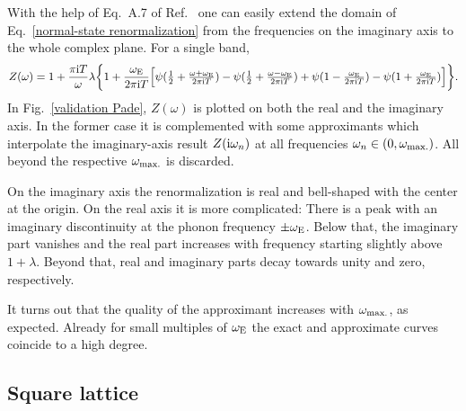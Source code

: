 With the help of Eq.~A.7 of Ref.~ one can easily
extend the domain of Eq.~\ref{normal-state renormalization} from the
 frequencies on the imaginary axis to the whole complex plane.
For a single band,
%
\begin{equation*}
    Z(\omega) = 1 + \frac {\pi \mathrm i T} \omega \lambda \bigg \{
        1 + \frac{\omega \sb{\text{E}}}{2 \pi \mathrm i T} \Big[
              \psi(\tfrac 1 2 + \tfrac{\omega + \omega \sb{\text{E}}}{2 \pi \mathrm i T})
            - \psi(\tfrac 1 2 + \tfrac{\omega - \omega \sb{\text{E}}}{2 \pi \mathrm i T})
            + \psi(1 - \tfrac{\omega \sb{\text{E}}}{2 \pi \mathrm i T})
            - \psi(1 + \tfrac{\omega \sb{\text{E}}}{2 \pi \mathrm i T})
        \Big]
    \bigg \}.
\end{equation*}
%
In Fig.~\ref{validation Pade}, $Z(\omega)$ is plotted on both the real and the
imaginary axis. In the former case it is complemented with some 
approximants which interpolate the imaginary-axis result $Z(\mathrm i \omega_n)$ at all
 frequencies $\omega_n \in (0, \omega \sb{\text{max.}})$. All beyond
the respective $\omega \sb{\text{max.}}$ is discarded.

On the imaginary axis the renormalization is real and bell-shaped with the
center at the origin. On the real axis it is more complicated: There is a peak
with an imaginary discontinuity at the phonon frequency $\pm \omega \sb{\text{E}}$.
Below that, the imaginary part vanishes and the real part increases with
frequency starting slightly above $1 + \lambda$. Beyond that, real and imaginary
parts decay towards unity and zero, respectively.

It turns out that the quality of the  approximant increases with
$\omega \sb{\text{max.}}$, as expected. Already for small multiples of $\omega \sb{\text{E}}$
the exact and approximate curves coincide to a high degree.

\subsection{Square lattice}
\label{square lattice}

